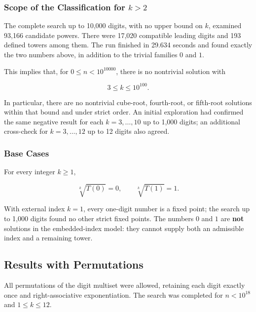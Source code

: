\documentclass[11pt,a4paper]{article}
\begin{document}
\subsubsection{Scope of the Classification for $k>2$}

The complete search up to 10,000 digits, with no upper bound on $k$, examined 93,166 candidate powers. There were 17,020 compatible leading digits and 193 defined towers among them. The run finished in 29.634 seconds and found exactly the two numbers above, in addition to the trivial families $0$ and $1$.

This implies that, for $0\leq n<10^{10000}$, there is no nontrivial solution with

\[
3\leq k\leq10^{100}.
\]

In particular, there are no nontrivial cube-root, fourth-root, or fifth-root solutions within that bound and under strict order. An initial exploration had confirmed the same negative result for each $k=3,\ldots,10$ up to 1,000 digits; an additional cross-check for $k=3,\ldots,12$ up to 12 digits also agreed.

\subsubsection{Base Cases}

For every integer $k\geq1$,

\[
\sqrt[k]{T(0)}=0,\qquad \sqrt[k]{T(1)}=1.
\]

With external index $k=1$, every one-digit number is a fixed point; the search up to 1,000 digits found no other strict fixed points. The numbers $0$ and $1$ are \textbf{not} solutions in the embedded-index model: they cannot supply both an admissible index and a remaining tower.

\subsection{Results with Permutations}

All permutations of the digit multiset were allowed, retaining each digit exactly once and right-associative exponentiation. The search was completed for $n<10^{18}$ and $1\leq k\leq12$.
\end{document}
